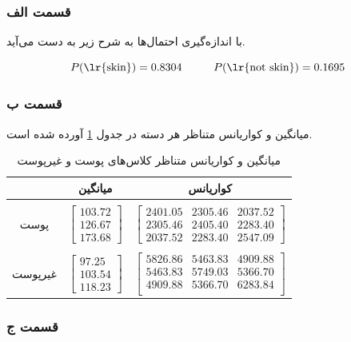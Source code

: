\documentclass{article}
\begin{document}
\subsubsection*{قسمت الف}

با اندازه‌گیری احتمال‌ها به شرح زیر به دست می‌آید.

$$P(\text{\lr{skin}}) = 0.8304 \hspace{1cm} P(\text{\lr{not skin}}) = 0.1695$$

\subsubsection*{قسمت ب}

میانگین و کواریانس متناظر هر دسته در جدول \ref{parti-skin-non-skin-mean-covariance} آورده شده است.

\begin{table}[h]
    \centering
    \caption{میانگین و کواریانس متناظر کلاس‌های پوست و غیر‌پوست}
    \label{parti-skin-non-skin-mean-covariance}
    \begin{tabular}{c|c|c}
        & میانگین & کواریانس \\
        \hline
        & & \\
        پوست & $\begin{bmatrix}103.72 \\ 126.67 \\ 173.68\end{bmatrix}$ & $\begin{bmatrix}2401.05 & 2305.46 & 2037.52 \\ 2305.46 & 2405.40 & 2283.40 \\ 2037.52 & 2283.40 & 2547.09 \end{bmatrix}$ \\
        & & \\
        غیرپوست & $\begin{bmatrix}97.25 \\ 103.54 \\ 118.23\end{bmatrix}$ & $\begin{bmatrix}5826.86 & 5463.83 & 4909.88 \\ 5463.83 & 5749.03 & 5366.70 \\ 4909.88 & 5366.70 & 6283.84 \\\end{bmatrix}$
    \end{tabular}
\end{table}

\subsubsection*{قسمت ج}
\end{document}
